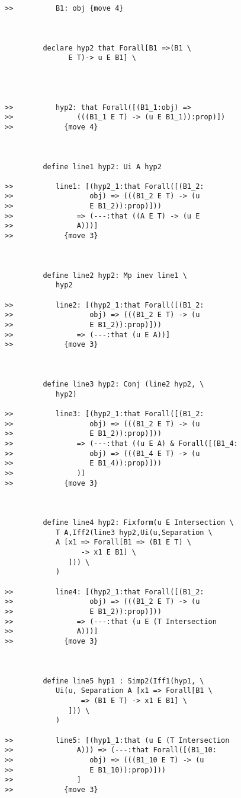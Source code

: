 \documentclass[12pt]{article}
\begin{document}
\begin{verbatim}
>>          B1: obj {move 4}



         declare hyp2 that Forall[B1 =>(B1 \
               E T)-> u E B1] \
            



>>          hyp2: that Forall([(B1_1:obj) =>
>>               (((B1_1 E T) -> (u E B1_1)):prop)])
>>            {move 4}



         define line1 hyp2: Ui A hyp2

>>          line1: [(hyp2_1:that Forall([(B1_2:
>>                  obj) => (((B1_2 E T) -> (u
>>                  E B1_2)):prop)]))
>>               => (---:that ((A E T) -> (u E
>>               A)))]
>>            {move 3}



         define line2 hyp2: Mp inev line1 \
            hyp2

>>          line2: [(hyp2_1:that Forall([(B1_2:
>>                  obj) => (((B1_2 E T) -> (u
>>                  E B1_2)):prop)]))
>>               => (---:that (u E A))]
>>            {move 3}



         define line3 hyp2: Conj (line2 hyp2, \
            hyp2)

>>          line3: [(hyp2_1:that Forall([(B1_2:
>>                  obj) => (((B1_2 E T) -> (u
>>                  E B1_2)):prop)]))
>>               => (---:that ((u E A) & Forall([(B1_4:
>>                  obj) => (((B1_4 E T) -> (u
>>                  E B1_4)):prop)]))
>>               )]
>>            {move 3}



         define line4 hyp2: Fixform(u E Intersection \
            T A,Iff2(line3 hyp2,Ui(u,Separation \
            A [x1 => Forall[B1 => (B1 E T) \
                  -> x1 E B1] \
               ])) \
            )

>>          line4: [(hyp2_1:that Forall([(B1_2:
>>                  obj) => (((B1_2 E T) -> (u
>>                  E B1_2)):prop)]))
>>               => (---:that (u E (T Intersection
>>               A)))]
>>            {move 3}



         define line5 hyp1 : Simp2(Iff1(hyp1, \
            Ui(u, Separation A [x1 => Forall[B1 \
                  => (B1 E T) -> x1 E B1] \
               ])) \
            )

>>          line5: [(hyp1_1:that (u E (T Intersection
>>               A))) => (---:that Forall([(B1_10:
>>                  obj) => (((B1_10 E T) -> (u
>>                  E B1_10)):prop)]))
>>               ]
>>            {move 3}




\end{verbatim}
\end{document}
